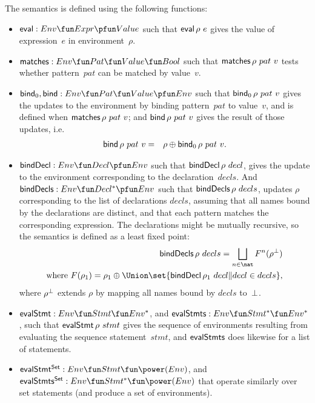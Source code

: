 
The semantics is defined using the following functions:
%
\begin{itemize}
\item $\eval : Env \fun Expr \pfun Value$ such that $\mathop{\sf eval} \rho~e$ gives the
  value of expression~$e$ in environment~$\rho$.

\item $\matches : Env \fun Pat \fun Value \fun Bool$ such that
  $\mathop{\sf matches} \rho~pat ~ v$ tests whether pattern~$pat$ can be matched by
  value~$v$.

\item $\bind_0, \bind : Env \fun Pat \fun Value \pfun Env$ such that
  $\mathop{\sf bind}\nolimits_0 \rho~pat~v$ gives the updates to the environment by binding
  pattern~$pat$ to value~$v$, and is defined when $\mathop{\sf matches} \rho~ pat~v$; and 
  $\mathop{\sf bind}\nolimits \rho~pat~v$ gives the result of those updates, i.e.
  \begin{eqnarray*}
  \mathop{\sf bind}\nolimits \rho~pat~v & = & \rho \oplus \mathop{\sf bind}\nolimits_0 \rho~pat~v.
  \end{eqnarray*}

\item $\bindDecl : Env \fun Decl \pfun Env$ such that $\mathop{\sf bindDecl} \rho~decl$,
  gives the update to the environment corresponding to the
  declaration~$decls$.  And $\bindDecls : Env \fun Decl^* \pfun Env$ such that
  $\mathop{\sf bindDecls} \rho~decls$, updates $\rho$ corresponding to the list of
  declarations $decls$, assuming that all names bound by the declarations are
  distinct, and that each pattern matches the corresponding expression.  The
  declarations might be mutually recursive, so the semantics is defined as a
  least fixed point:
  \[
  \begin{align}
  \bindDecls \rho~decls = \bigsqcup_{n \in \nat} F^n(\rho^\bottom) \\
  \mbox{where } F(\rho_1)  =  
    \rho_1 \oplus \Union \set{\bindDecl \rho_1 ~ decl \| decl \in decls},
  \end{align}
  \]
  where $\rho^\perp$ extends $\rho$ by mapping all names bound by $decls$
  to~$\perp$. 

\item $\evalStmt: Env \fun Stmt \fun Env^*$, and $\evalStmts : Env \fun Stmt^*
  \fun Env^*$, such that $\mathop{\sf evalStmt} \rho~stmt$ gives the sequence of
  environments resulting from evaluating the sequence statement~$stmt$, and
  $\mathop{\sf evalStmts}$ does likewise for a list of statements.

\item $\evalStmtSet : Env \fun Stmt \fun \power(Env)$, and $\evalStmtsSet :
  Env \fun Stmt^* \fun \power(Env)$ that operate similarly over set statements
  (and produce a set of environments).
\end{itemize}

